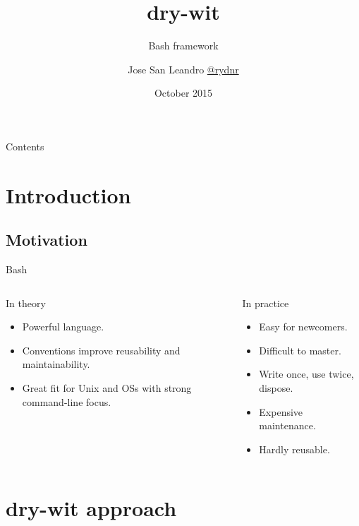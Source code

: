 \documentclass{beamer}
\title{dry-wit}
\subtitle{Bash framework}
\author{Jose San Leandro \href{http://twitter.com/rydnr}{@rydnr}}
\institute[OSOCO]{%
  \href{http://www.osoco.es}{OSOCO}
}
\date[10/2015]{October 2015}
\begin{document}
\begin{frame}[plain]
  \titlepage
\end{frame}

\begin{frame}[plain]{Contents}
  \tableofcontents[hideallsubsections]
\end{frame}

\section{Introduction}

\subsection{Motivation}

\begin{frame}{Bash}
	\begin{columns}[t]
		\begin{block}{In theory}
			\begin{itemize}
				\item Powerful language.
				\item Conventions improve reusability and maintainability.
				\item Great fit for Unix and OSs with strong command-line focus.
			\end{itemize}
		\end{block}
		\pause

		\begin{block}{In practice}
			\begin{itemize}
				\item Easy for newcomers.
				\item Difficult to master.
                                \item Write once, use twice, dispose.
                                \item Expensive maintenance.
                                \item Hardly reusable.
			\end{itemize}
		\end{block}

	\end{columns}
\end{frame}

\section{dry-wit approach}
\end{document}
